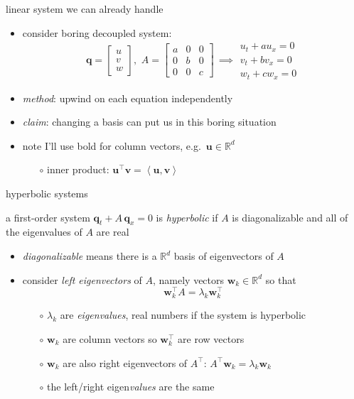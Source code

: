 \documentclass[10pt,dvipsnames,usepdftitle=false,
hyperref={pdftitle = {Finite volume methods},
    pdfauthor = {Ed Bueler}}]{beamer}
\newcommand{\bq}{\mathbf{q}}
\newcommand{\bv}{\mathbf{v}}
\newcommand{\bu}{\mathbf{u}}
\newcommand{\bw}{\mathbf{w}}
\newcommand{\RR}{\mathbb{R}}
\newcommand{\ip}[2]{\left<#1,#2\right>}
\begin{document}
\begin{frame}{linear system we can already handle}

\begin{itemize}
\item consider boring decoupled system:
        $$\bq = \begin{bmatrix} u \\ v \\ w \end{bmatrix}, \,\, A = \begin{bmatrix} a & 0 & 0 \\ 0 & b & 0 \\ 0 & 0 & c \end{bmatrix} \, \implies \begin{matrix} u_t + a u_x = 0 \\ v_t + b v_x = 0 \\ w_t + c w_x = 0 \end{matrix}$$
\item \emph{method}: upwind on each equation independently
\item \emph{claim}: changing a basis can put us in this boring situation

\bigskip
\item note I'll use bold for column vectors, e.g.~$\bu\in\RR^d$
    \begin{itemize}
    \item[$\circ$] inner product: \quad $\bu^\top \bv = \ip{\bu}{\bv}$
    \end{itemize}
\end{itemize}
\end{frame}


\begin{frame}{hyperbolic systems}

\begin{definition} a first-order system $\bq_t + A\, \bq_x=0$ is \emph{hyperbolic} if $A$ is diagonalizable and all of the eigenvalues of $A$ are real
\end{definition}

\begin{itemize}
\item \emph{diagonalizable} means there is a $\RR^d$ basis of eigenvectors of $A$
\item consider \emph{left eigenvectors} of $A$, namely vectors $\bw_k \in \RR^d$ so that
    $$\bw_k^\top A = \lambda_k \bw_k^\top$$

\vspace{-2mm}
    \begin{itemize}
    \item[$\circ$] $\lambda_k$ are \emph{eigenvalues}, real numbers if the system is hyperbolic
    \item[$\circ$] $\bw_k$ are column vectors so $\bw_k^\top$ are row vectors
    \item[$\circ$] $\bw_k$ are also right eigenvectors of $A^\top$: \qquad $A^\top \bw_k = \lambda_k \bw_k$
    \item[$\circ$] the left/right eigen\emph{values} are the same
    \end{itemize}
\end{itemize}
\end{frame}
\end{document}
